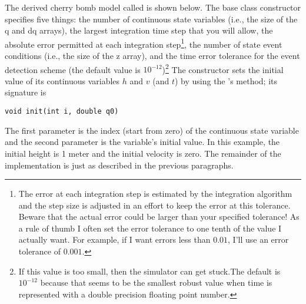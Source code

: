 The  derived cherry bomb model called  is shown below. The base class constructor specifies five things: the number of continuous state variables (i.e., the size of the q and dq arrays), the largest integration time step that you will allow, the absolute error permitted at each integration step\footnote{The error at each integration step is estimated by the integration algorithm and the step size is adjusted in an effort to keep the error at this tolerance. Beware that the actual error could be larger than your specified tolerance! As a rule of thumb I often set the error tolerance to one tenth of the value I actually want. For example, if I want errors less than $0.01$, I'll use an error tolerance of $0.001$.}, the number of state event conditions (i.e., the size of the z array), and the time error tolerance for the event detection scheme (the default value is $10^{-12}$)\footnote{If this value is too small, then the simulator can get stuck.The default is $10^{-12}$ because that seems to be the smallest robust value when time is represented with a double precision floating point number.} The  constructor sets the initial value of its continuous variables $h$ and $v$ (and $t$) by using the 's  method; its signature is
\begin{verbatim}
void init(int i, double q0)
\end{verbatim}
The first parameter is the index (start from zero) of the continuous state variable and the second parameter is the variable's initial value. In this example, the initial height is 1 meter and the initial velocity is zero. The remainder of the  implementation is just as described in the previous paragraphs.

